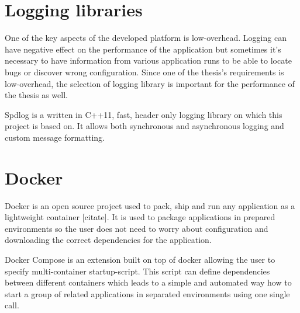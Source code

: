 \section{Logging libraries}
One of the key aspects of the developed platform is low-overhead. Logging can have negative effect on the performance of the application but sometimes it's necessary to have information from various application runs to be able to locate bugs or discover wrong configuration. Since one of the thesis's requirements is low-overhead, the selection of logging library is important for the performance of the thesis as well. 

Spdlog is a written in C++11, fast, header only logging library on which this project is based on. It allows both synchronous and asynchronous logging and custom message formatting.
\section{Docker}
Docker is an open source project used to pack, ship and run any application as a lightweight container [citate]. It is used to package applications in prepared environments so the user does not need to worry about configuration and downloading the correct dependencies for the application. 

Docker Compose is an extension built on top of docker allowing the user to specify multi-container startup-script. This script can define dependencies between different containers which leads to a simple and automated way how to start a group of related applications in separated environments using one single call. 

